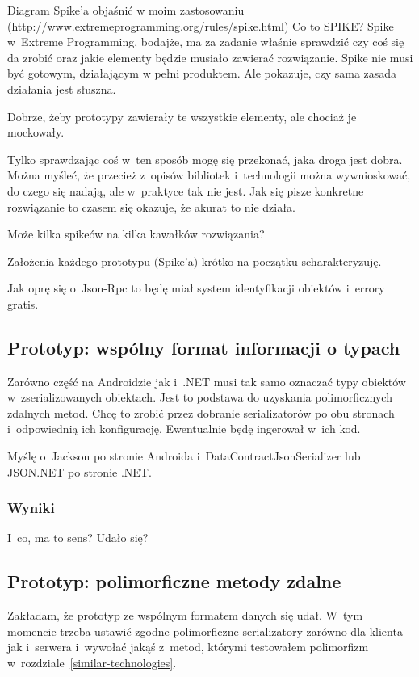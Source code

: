 Diagram Spike'a objaśnić w moim zastosowaniu (\url{http://www.extremeprogramming.org/rules/spike.html})
Co to SPIKE? Spike w~Extreme Programming, bodajże, ma za zadanie właśnie sprawdzić czy coś się da zrobić oraz jakie elementy będzie musiało zawierać rozwiązanie.
Spike nie musi być gotowym, działającym w pełni produktem. Ale pokazuje, czy sama zasada działania jest słuszna.


Dobrze, żeby prototypy zawierały te wszystkie elementy, ale chociaż je mockowały.

Tylko sprawdzając coś w~ten sposób mogę się przekonać, jaka droga jest dobra. Można myśleć, że przecież z~opisów bibliotek i~technologii można wywnioskować, do czego się nadają, ale w~praktyce tak nie jest. Jak się pisze konkretne rozwiązanie to czasem się okazuje, że akurat to nie działa.


Może kilka spikeów na kilka kawałków rozwiązania?

Założenia każdego prototypu (Spike'a) krótko na początku scharakteryzuję.

Jak oprę się o~Json-Rpc to będę miał system identyfikacji obiektów i~errory gratis.

\subsection{Prototyp: wspólny format informacji o typach}
Zarówno część na Androidzie jak i~.NET musi tak samo oznaczać typy obiektów w~zserializowanych obiektach.
Jest to podstawa do uzyskania polimorficznych zdalnych metod.
Chcę to zrobić przez dobranie serializatorów po obu stronach i~odpowiednią ich konfigurację. Ewentualnie będę ingerował w~ich kod.

Myślę o~Jackson po stronie Androida i~DataContractJsonSerializer lub JSON.NET po stronie .NET\@.

\subsubsection{Wyniki}
I~co, ma to sens? Udało się?


\subsection{Prototyp: polimorficzne metody zdalne}
Zakładam, że prototyp ze wspólnym formatem danych się udał.
W~tym momencie trzeba ustawić zgodne polimorficzne serializatory zarówno dla klienta jak i~serwera i~wywołać jakąś z~metod, którymi testowałem polimorfizm w~rozdziale~\ref{similar-technologies}.

